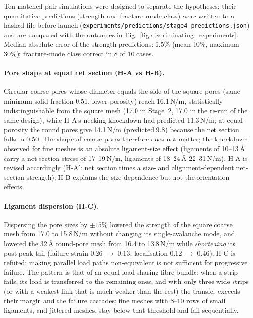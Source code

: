 Ten matched-pair simulations were designed to separate the hypotheses; their quantitative predictions (strength and fracture-mode class) were written to a hashed file before launch (\texttt{experiments/\allowbreak predictions/\allowbreak stage4\_\allowbreak predictions.json}) and are compared with the outcomes in Fig.~\ref{fig:discriminating_experiments}. Median absolute error of the strength predictions: 6.5\% (mean 10\%, maximum 30\%); fracture-mode class correct in 8 of 10 cases.

\paragraph{Pore shape at equal net section (H-A vs H-B).} Circular coarse pores whose diameter equals the side of the square pores (same minimum solid fraction 0.51, lower porosity) reach 16.1\,N/m, statistically indistinguishable from the square mesh (17.0 in Stage~2, 17.0 in the re-run of the same design), while H-A's necking knockdown had predicted 11.3\,N/m; at equal porosity the round pores give 14.1\,N/m (predicted 9.8) because the net section falls to 0.50. The shape of coarse pores therefore does not matter; the knockdown observed for fine meshes is an absolute ligament-size effect (ligaments of 10--13\,\AA{} carry a net-section stress of 17--19\,N/m, ligaments of 18--24\,\AA{} 22--31\,N/m). H-A is revised accordingly (H-A$'$: net section times a size- and alignment-dependent net-section strength); H-B explains the size dependence but not the orientation effects.

\paragraph{Ligament dispersion (H-C).} Dispersing the pore sizes by $\pm15\%$ lowered the strength of the square coarse mesh from 17.0 to 15.8\,N/m without changing its single-avalanche mode, and lowered the 32\,\AA{} round-pore mesh from 16.4 to 13.8\,N/m while \emph{shortening} its post-peak tail (failure strain 0.26 $\to$ 0.13, localisation 0.12 $\to$ 0.46). H-C is refuted: making parallel load paths non-equivalent is not sufficient for progressive failure. The pattern is that of an equal-load-sharing fibre bundle: when a strip fails, its load is transferred to the remaining ones, and with only three wide strips (or with a weakest link that is much weaker than the rest) the transfer exceeds their margin and the failure cascades; fine meshes with 8--10 rows of small ligaments, and jittered meshes, stay below that threshold and fail sequentially.

